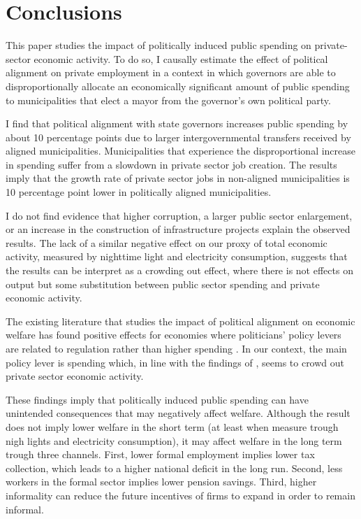\documentclass[dv_diss_main.tex]{subfiles}
\begin{document}
\section{Conclusions}

This paper studies the impact of politically induced public spending on private-sector economic activity. To do so, I causally estimate the effect of political alignment on private employment in a context in which governors are able to disproportionally allocate an economically significant amount of public spending to municipalities that elect a mayor from the governor's own political party. 

I find that political alignment with state governors increases public spending by about 10 percentage points due to larger intergovernmental transfers received by aligned municipalities. Municipalities that experience the disproportional increase in spending suffer from a slowdown in private sector job creation. The results imply that the growth rate of private sector jobs in non-aligned municipalities is 10 percentage point lower in politically aligned municipalities. 

I do not find evidence that higher corruption, a larger public sector enlargement, or an increase in the construction of infrastructure  projects explain the observed results. The lack of a similar negative effect on our proxy of total economic activity, measured by nighttime light and electricity consumption, suggests that the results can be interpret as a crowding out effect, where there is not effects on output but some substitution between public sector spending and private economic activity. 

The existing literature that studies the impact of political alignment on economic welfare has found positive effects for economies where politicians' policy levers are related to regulation rather than higher spending  \citep{asher2017politics}. In our context, the main policy lever is spending which, in line with the findings of \cite{cohen2011powerful}, seems to crowd out private sector economic activity.

These findings imply that politically induced public spending can have unintended consequences that may negatively affect welfare. Although the result does not imply lower welfare in the short term (at least when measure trough nigh lights and electricity consumption), it may affect welfare in the long term trough three channels. First, lower formal employment implies lower tax collection, which leads to a higher national deficit in the long run. Second, less workers in the formal sector implies lower pension savings. Third, higher informality can reduce the future incentives of firms to expand in order to remain informal.
\end{document}

